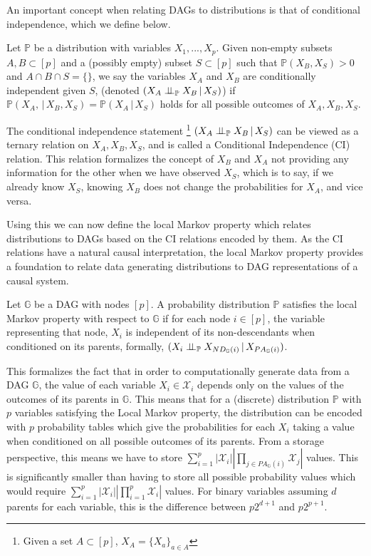 \documentclass{tufte-book}
\begin{document}
An important concept when relating DAGs to distributions is that of conditional independence, which we define below.
\begin{definition}\label{def:cirel}
Let  $\mathbb{P}$ be a distribution with variables $X_1,...,X_p$. Given non-empty subsets $A,B \subset [p]$ and a (possibly empty) subset $S \subset [p]$ such that $\mathbb{P}(X_B, X_S)>0$ and $A \cap B \cap S = \{\}$, we say the variables $X_A$ and $X_B$ are conditionally independent given $S$, (denoted $(X_A\perp \!\!\! \perp_{\mathbb{P}} X_B \,|\, X_S)$) if $\mathbb{P}(X_A, \,|\,X_B, X_S) = \mathbb{P}(X_A \, |\, X_S)$ holds for all possible outcomes of $X_A,X_B,X_S$.
\end{definition}

The conditional independence statement  \footnote{Given a set $A \subset [p]$, $X_A = \{X_a \}_{a \in A}$}   \((X_A \perp \!\!\! \perp_{\mathbb{P}} X_B \,|\,X_S)\) can be viewed as a ternary relation on \(X_A,X_B,X_S\), and is called a Conditional Independence (CI) relation. This relation formalizes the concept of \(X_B\) and \(X_A\) not providing any information for the other when we have observed \(X_S\), which is to say, if we already know \(X_S\), knowing \(X_B\) does not change the probabilities for \(X_A\), and vice versa.


Using this we can now define the local Markov property which relates distributions to DAGs based on the CI relations encoded by them. As the CI relations have a natural causal interpretation, the local Markov property provides a foundation to relate data generating distributions to DAG representations of a causal system.


\begin{definition}\label{thm:localmarkovdag}
Let $\mathbb{G}$ be a DAG with nodes $[p]$. A probability distribution $\mathbb{P}$ satisfies the local Markov property with respect to $\mathbb{G}$ if for each node $i \in [p]$, the variable representing that node, $X_i$ is independent of its non-descendants when conditioned on its parents, formally, $(X_i \perp \!\!\! \perp_{\mathbb{P}} X_{ND_{\mathbb{G}}(i)}\,|\,X_{PA_{\mathbb{G}}(i)})$.
\end{definition}

This formalizes the fact that in order to computationally generate data from a DAG \(\mathbb{G}\), the value of each variable \(X_i \in \mathcal{X}_i\) depends only on the values of the outcomes of its parents in \(\mathbb{G}\). This means that for a (discrete) distribution \(\mathbb{P}\) with \(p\) variables satisfying the Local Markov property, the distribution can be encoded with \(p\) probability tables which give the probabilities for each \(X_i\) taking a value when conditioned on all possible outcomes of its parents. From a storage perspective, this means we have to store \(\sum_{i=1}^p |\mathcal{X}_i| |\prod_{j \in PA_{\mathbb{G}}(i)}\mathcal{X}_j |\) values. This is significantly smaller than having to store all possible probability values which would require  \(\sum_{i=1}^p |\mathcal{X}_i||\prod_{i=1}^p \mathcal{X}_i|\) values. For binary variables assuming \(d\) parents for each variable, this is the difference between \(p2^{d+1}\) and \(p2^{p+1}\).
\end{document}
